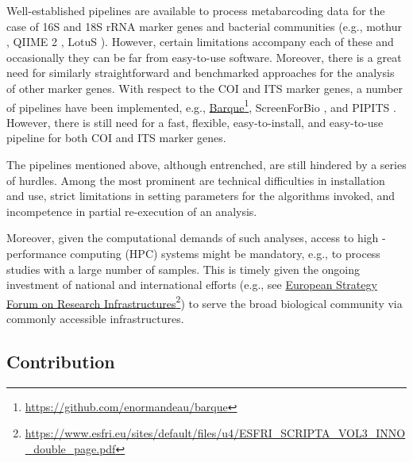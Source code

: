    Well-established pipelines are available to process metabarcoding data for the case of 16S and 18S rRNA marker genes and bacterial communities (e.g., mothur \citep{schloss2009introducing}, QIIME 2 \citep{bolyen2018qiime}, LotuS \citep{hildebrand2014lotus}). 
   However, certain limitations accompany each of these and occasionally they can be far from easy-to-use software. Moreover, there is a great need for similarly straightforward and benchmarked approaches for the analysis of other marker genes. With respect to the COI and ITS marker genes, a number of pipelines have been implemented, e.g., \href{https://github.com/enormandeau/barque}{Barque}\footnote{\href{https://github.com/enormandeau/barque}{https://github.com/enormandeau/barque}}, ScreenForBio \citep{axtner2019efficient}, and PIPITS \citep{gweon2015pipits}. 
   However, there is still need for a fast, flexible, easy-to-install, and easy-to-use pipeline for both COI and ITS marker genes.
   
   The pipelines mentioned above, although entrenched, are still hindered by a series of hurdles. 
   Among the most prominent are technical difficulties in installation and use, strict limitations in setting parameters for the algorithms invoked, and incompetence in partial re-execution of an analysis.
   
   Moreover, given the computational demands of such analyses, access to high - performance computing (HPC) systems might be mandatory, e.g., to process studies with a large number of samples. 
   This is timely given the ongoing investment of national and international efforts (e.g., see 
   \href{https://www.esfri.eu/sites/default/files/u4/ESFRI_SCRIPTA_VOL3_INNO_double_page.pdf}{European Strategy Forum on Research Infrastructures}\footnote{\href{https://www.esfri.eu/sites/default/files/u4/ESFRI_SCRIPTA_VOL3_INNO_double_page.pdf}{https://www.esfri.eu/sites/default/files/u4/ESFRI\_SCRIPTA\_VOL3\_INNO\_double\_page.pdf}}) 
   to serve the broad biological community via commonly accessible infrastructures.
   
   \subsection{Contribution}

